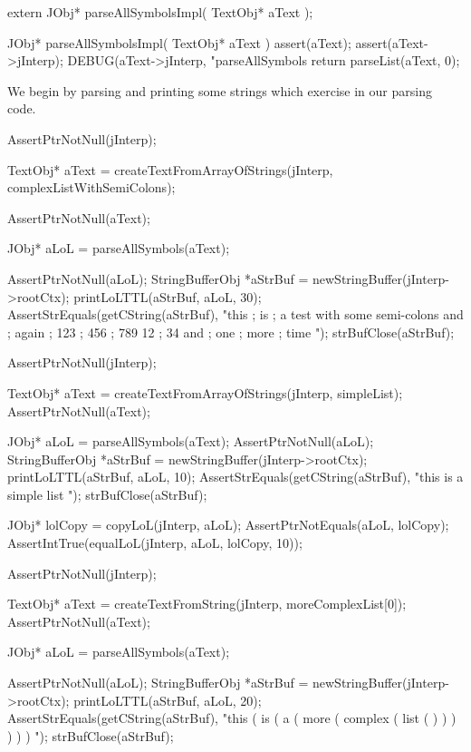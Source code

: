 \startCHeader
extern JObj* parseAllSymbolsImpl(
  TextObj* aText
);
\stopCHeader
{}

\startCCode
JObj* parseAllSymbolsImpl(
  TextObj* aText
) {
  assert(aText);
  assert(aText->jInterp);
  DEBUG(aText->jInterp, "parseAllSymbols %
  return parseList(aText, 0);
}
\stopCCode

We begin by parsing and printing some strings which exercise  in our parsing code. 

\startCTest
  AssertPtrNotNull(jInterp);

  TextObj* aText =
    createTextFromArrayOfStrings(jInterp, complexListWithSemiColons);

  AssertPtrNotNull(aText);

  JObj* aLoL = parseAllSymbols(aText);

  AssertPtrNotNull(aLoL);
  StringBufferObj *aStrBuf = newStringBuffer(jInterp->rootCtx);
  printLoLTTL(aStrBuf, aLoL, 30);
  AssertStrEquals(getCString(aStrBuf),
    "this ; is ; a test with some semi-colons and ; again ; 123 ; 456 ; 789 12 ; 34 and ; one ; more ; time ");
  strBufClose(aStrBuf);
\stopCTest
\stopTestCase

\startCTest
  AssertPtrNotNull(jInterp);

  TextObj* aText =
    createTextFromArrayOfStrings(jInterp, simpleList);
  AssertPtrNotNull(aText);

  JObj* aLoL = parseAllSymbols(aText);
  AssertPtrNotNull(aLoL);
  StringBufferObj *aStrBuf = newStringBuffer(jInterp->rootCtx);
  printLoLTTL(aStrBuf, aLoL, 10);
  AssertStrEquals(getCString(aStrBuf), "this is a simple list ");
  strBufClose(aStrBuf);

  JObj* lolCopy = copyLoL(jInterp, aLoL);
  AssertPtrNotEquals(aLoL, lolCopy);
  AssertIntTrue(equalLoL(jInterp, aLoL, lolCopy, 10));
\stopCTest
\stopTestCase

\startCTest
  AssertPtrNotNull(jInterp);

  TextObj* aText =
    createTextFromString(jInterp, moreComplexList[0]);
  AssertPtrNotNull(aText);

  JObj* aLoL = parseAllSymbols(aText);

  AssertPtrNotNull(aLoL);
  StringBufferObj *aStrBuf = newStringBuffer(jInterp->rootCtx);
  printLoLTTL(aStrBuf, aLoL, 20);
  AssertStrEquals(getCString(aStrBuf),
    "this ( is ( a ( more ( complex ( list ( ) ) ) ) ) ) ");
  strBufClose(aStrBuf);
\stopCTest
\stopTestCase

